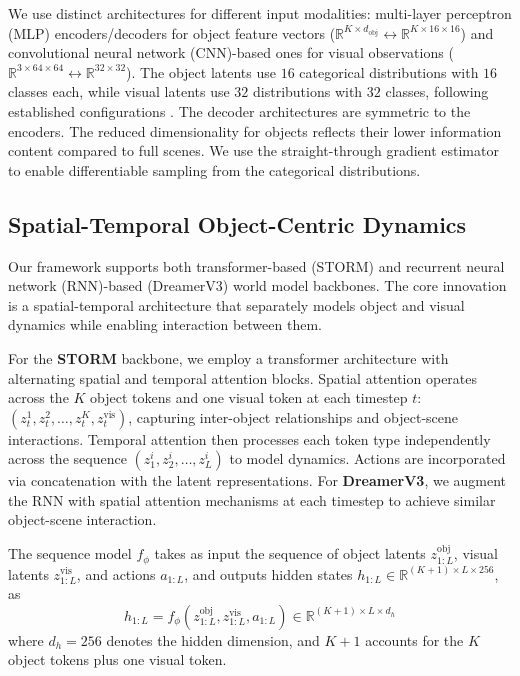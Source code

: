 \documentclass{article} %
\begin{document}
We use distinct architectures for different input modalities: multi-layer perceptron (MLP) encoders/decoders for object feature vectors ($\mathbb{R}^{K \times d_{\mathrm{obj}}} \leftrightarrow \mathbb{R}^{K \times 16 \times 16}$) and convolutional neural network (CNN)-based ones for visual observations ($\mathbb{R}^{3 \times 64 \times 64} \leftrightarrow \mathbb{R}^{32 \times 32}$). The object latents use $16$ categorical distributions with $16$ classes each, while visual latents use $32$ distributions with $32$ classes, following established configurations \citep{hafner_mastering_2023, zhang_storm_2023}. The decoder architectures are symmetric to the encoders. The reduced dimensionality for objects reflects their lower information content compared to full scenes. We use the straight-through gradient estimator \citep{bengio_estimating_2013} to enable differentiable sampling from the categorical distributions.

\subsection{Spatial-Temporal Object-Centric Dynamics} \label{sec:spatial-temporal}

Our framework supports both transformer-based (STORM) and recurrent neural network (RNN)-based (DreamerV3) world model backbones. The core innovation is a spatial-temporal architecture that separately models object and visual dynamics while enabling interaction between them.

For the \textbf{STORM} backbone, we employ a transformer architecture with alternating spatial and temporal attention blocks. Spatial attention operates across the $K$ object tokens and one visual token at each timestep $t$: $(z_t^1, z_t^2, \ldots, z_t^K, z_t^{\mathrm{vis}})$, capturing inter-object relationships and object-scene interactions. Temporal attention then processes each token type independently across the sequence $(z_1^i, z_2^i, \ldots, z_L^i)$ to model dynamics. Actions are incorporated via concatenation with the latent representations.
For \textbf{DreamerV3}, we augment the RNN with spatial attention mechanisms at each timestep to achieve similar object-scene interaction. 

The sequence model $f_\phi$ takes as input the sequence of object latents $z^{\mathrm{obj}}_{1:L}$, visual latents $z^{\mathrm{vis}}_{1:L}$, and actions $a_{1:L}$, and outputs hidden states $h_{1:L} \in \mathbb{R}^{(K+1) \times L \times 256}$, as  
\begin{equation} \label{eq:world-model-sequence}
h_{1:L} = f_\phi(z^{\mathrm{obj}}_{1:L}, z^{\mathrm{vis}}_{1:L}, a_{1:L}) \in \mathbb{R}^{(K+1) \times L \times d_h}
\end{equation}
where $d_h = 256$ denotes the hidden dimension, and $K+1$ accounts for the $K$ object tokens plus one visual token.
\end{document}
